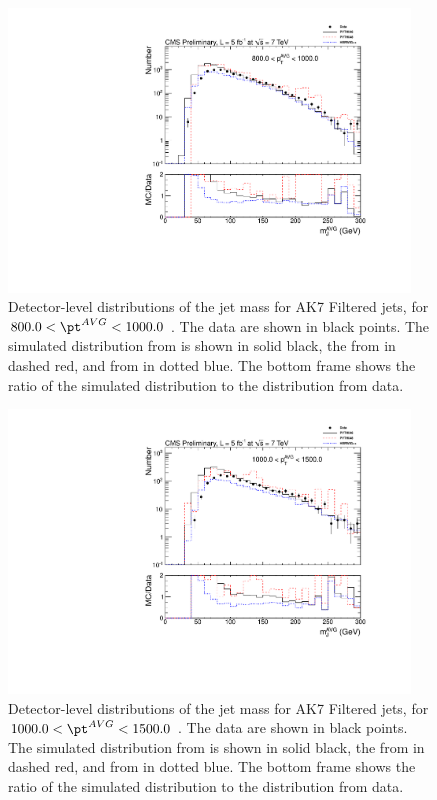 \begin{figure}[htbp]
\centering
\includegraphics[width=0.95\textwidth]{figs/histAK7MjetVsPtAvg_rawDataMCComparisons_pt_9_Filtered}
\caption{Detector-level distributions of the jet mass for AK7 Filtered jets,
for $800.0 < \pt^{AVG} < 1000.0$ \GeVc. The data are shown in black points.
The simulated distribution from \PYTHIA is shown in solid black, 
the from \PYTHIAEIGHT in dashed red, and from \HERWIG in dotted blue. 
The bottom frame shows the ratio of the simulated distribution
to the distribution from data. 
\label{figs:histAK7MjetVsPtAvg_rawDataMCComparisons_pt_9_Filtered}}
\end{figure}



\begin{figure}[htbp]
\centering
\includegraphics[width=0.95\textwidth]{figs/histAK7MjetVsPtAvg_rawDataMCComparisons_pt_10_Filtered}
\caption{Detector-level distributions of the jet mass for AK7 Filtered jets,
for $1000.0 < \pt^{AVG} < 1500.0$ \GeVc. The data are shown in black points.
The simulated distribution from \PYTHIA is shown in solid black, 
the from \PYTHIAEIGHT in dashed red, and from \HERWIG in dotted blue. 
The bottom frame shows the ratio of the simulated distribution
to the distribution from data. 
\label{figs:histAK7MjetVsPtAvg_rawDataMCComparisons_pt_10_Filtered}}
\end{figure}

